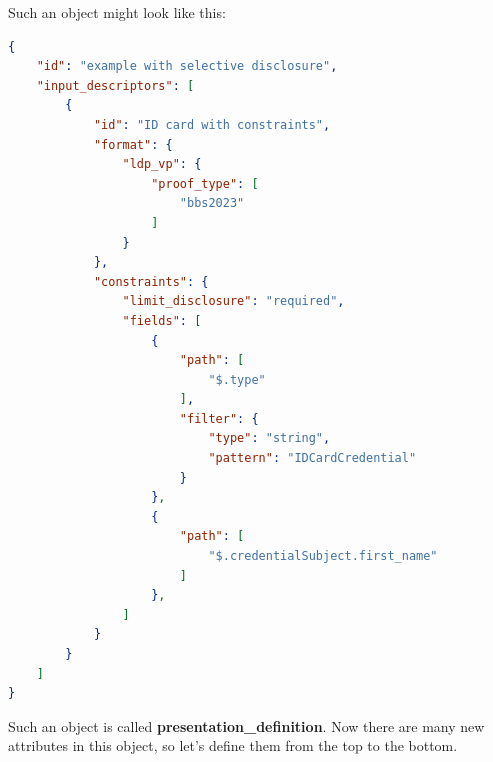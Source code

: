 \documentclass[
	a4paper               %
	,BCOR=0mm            %
	,bibliography=totoc   %
	,listof=totoc         %
	,monolingual
	,twoside=false
]{bfhthesis}              %
\begin{document}
Such an object might look like this:
\begin{lstlisting}[language=json,firstnumber=1,caption={Example of a presentation definition},captionpos=b, label={list:presdef}]
{
	"id": "example with selective disclosure",
	"input_descriptors": [
		{
			"id": "ID card with constraints",
			"format": {
				"ldp_vp": {
					"proof_type": [
						"bbs2023"
					]
				}
			},
			"constraints": {
				"limit_disclosure": "required",
				"fields": [
					{
						"path": [
							"$.type"
						],
						"filter": {
							"type": "string",
							"pattern": "IDCardCredential"
						}
					},
					{
						"path": [
							"$.credentialSubject.first_name"
						]
					},
				]
			}
		}
	]
}
\end{lstlisting}

Such an object is called \textbf{presentation\_definition}.
Now there are many new attributes in this object, so let's define them from the top to the bottom. \\
\end{document}
